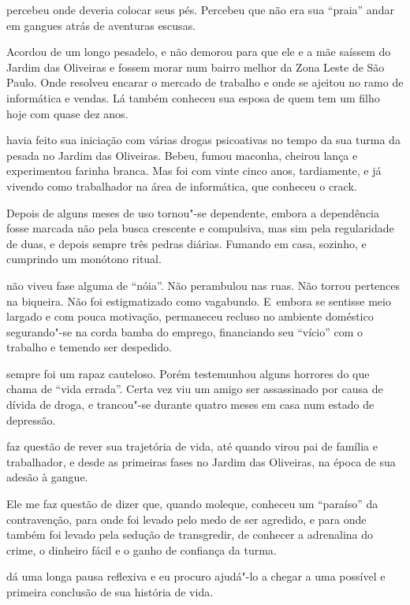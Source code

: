  percebeu onde deveria colocar seus pés. Percebeu que não era sua
``praia'' andar em gangues atrás de aventuras escusas.

Acordou de um longo pesadelo, e não demorou para que ele e a mãe saíssem
do Jardim das Oliveiras e fossem morar num bairro melhor da Zona Leste
de São Paulo. Onde  resolveu encarar o mercado de trabalho e onde se
ajeitou no ramo de informática e vendas. Lá também conheceu sua esposa
de quem tem um filho hoje com quase dez anos.

\asterisc{}

 havia feito sua iniciação com várias drogas psicoativas no tempo da
sua turma da pesada no Jardim das Oliveiras. Bebeu, fumou maconha,
cheirou lança e experimentou farinha branca. Mas foi com vinte cinco
anos, tardiamente, e já vivendo como trabalhador na área de informática,
que conheceu o crack.

Depois de alguns meses de uso tornou"-se dependente, embora a dependência
fosse marcada não pela busca crescente e compulsiva, mas sim pela
regularidade de duas, e depois sempre três pedras diárias. Fumando em
casa, sozinho, e cumprindo um monótono ritual.

 não viveu fase alguma de ``nóia''. Não perambulou nas ruas. Não
torrou pertences na biqueira. Não foi estigmatizado como vagabundo. E~embora se sentisse meio largado e com pouca motivação, permaneceu
recluso no ambiente doméstico segurando"-se na corda bamba do emprego,
financiando seu ``vício'' com o trabalho e temendo ser despedido.

 sempre foi um rapaz cauteloso. Porém testemunhou alguns horrores do
que chama de ``vida errada''. Certa vez viu um amigo ser assassinado por
causa de dívida de droga, e trancou"-se durante quatro meses em casa num
estado de depressão.

\asterisc{}

 faz questão de rever sua trajetória de vida, até quando virou pai de
família e trabalhador, e desde as primeiras fases no Jardim das
Oliveiras, na época de sua adesão à gangue.

Ele me faz questão de dizer que, quando moleque, conheceu um ``paraíso''
da contravenção, para onde foi levado pelo medo de ser agredido, e para
onde também foi levado pela sedução de transgredir, de conhecer a
adrenalina do crime, o dinheiro fácil e o ganho de confiança da turma.

\asterisc{}

 dá uma longa pausa reflexiva e eu procuro ajudá"-lo a chegar a uma
possível e primeira conclusão de sua história de vida.

